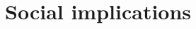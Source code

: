 \documentclass[10pt,english, openany]{book}
\begin{document}
\chapter{Social implications}
%
%
%
%
%
%
%
%
% 
% 
%
%
%
\end{document}
